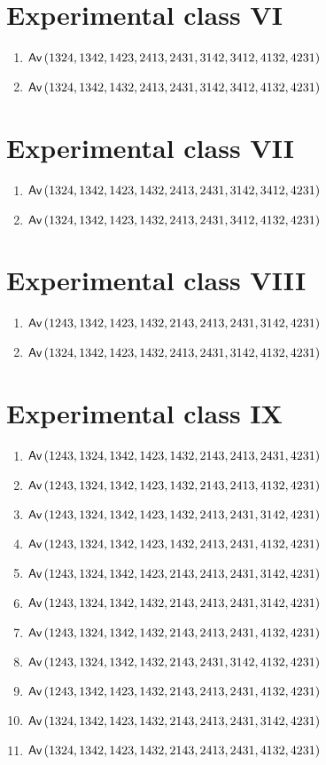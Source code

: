 \section{Experimental class VI}
\begin{enumerate}
\item $\textsf{Av}\left(1324,1342,1423,2413,2431,3142,3412,4132,4231\right)$
\item $\textsf{Av}\left(1324,1342,1432,2413,2431,3142,3412,4132,4231\right)$
\end{enumerate}

\section{Experimental class VII}
\begin{enumerate}
\item $\textsf{Av}\left(1324,1342,1423,1432,2413,2431,3142,3412,4231\right)$
\item $\textsf{Av}\left(1324,1342,1423,1432,2413,2431,3412,4132,4231\right)$
\end{enumerate}

\section{Experimental class VIII}
\begin{enumerate}
\item $\textsf{Av}\left(1243,1342,1423,1432,2143,2413,2431,3142,4231\right)$
\item $\textsf{Av}\left(1324,1342,1423,1432,2413,2431,3142,4132,4231\right)$
\end{enumerate}

\section{Experimental class IX}
\begin{enumerate}
\item $\textsf{Av}\left(1243,1324,1342,1423,1432,2143,2413,2431,4231\right)$
\item $\textsf{Av}\left(1243,1324,1342,1423,1432,2143,2413,4132,4231\right)$
\item $\textsf{Av}\left(1243,1324,1342,1423,1432,2413,2431,3142,4231\right)$
\item $\textsf{Av}\left(1243,1324,1342,1423,1432,2413,2431,4132,4231\right)$
\item $\textsf{Av}\left(1243,1324,1342,1423,2143,2413,2431,3142,4231\right)$
\item $\textsf{Av}\left(1243,1324,1342,1432,2143,2413,2431,3142,4231\right)$
\item $\textsf{Av}\left(1243,1324,1342,1432,2143,2413,2431,4132,4231\right)$
\item $\textsf{Av}\left(1243,1324,1342,1432,2143,2431,3142,4132,4231\right)$
\item $\textsf{Av}\left(1243,1342,1423,1432,2143,2413,2431,4132,4231\right)$
\item $\textsf{Av}\left(1324,1342,1423,1432,2143,2413,2431,3142,4231\right)$
\item $\textsf{Av}\left(1324,1342,1423,1432,2143,2413,2431,4132,4231\right)$
\end{enumerate}


